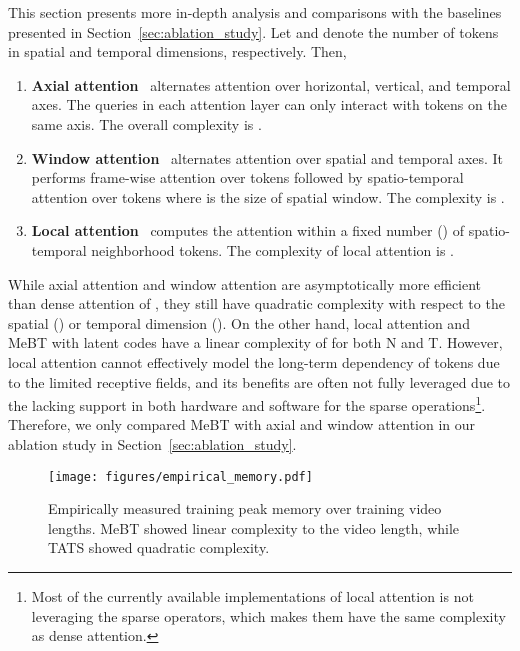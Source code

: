 \documentclass[10pt,twocolumn,letterpaper]{article}
\begin{document}
This section presents more in-depth analysis and comparisons with the baselines presented in Section~\ref{sec:ablation_study}.
Let  and  denote the number of tokens in spatial and temporal dimensions, respectively. Then,
\begin{enumerate}
    \item {\bf Axial attention}~\cite{Ho2019} alternates attention over horizontal, vertical, and temporal axes. 
    The queries in each attention layer can only interact with tokens on the same axis. 
    The overall complexity is .
    \item {\bf Window attention}~\cite{MaskViT} alternates attention over spatial and temporal axes. It performs frame-wise attention over  tokens followed by spatio-temporal attention over  tokens where  is the size of spatial window. The complexity is .
    \vspace{-0.4cm}
    \item {\bf Local attention}~\cite{NUWA} computes the attention within a fixed number () of spatio-temporal neighborhood tokens. The complexity of local attention is .
\end{enumerate}


While axial attention and window attention are asymptotically more efficient than dense attention of , they still have quadratic complexity with respect to the spatial () or temporal dimension (). On the other hand, local attention and MeBT with  latent codes have a linear complexity of  for both N and T. 
However, local attention cannot effectively model the long-term dependency of tokens due to the limited receptive fields, and its benefits are often not fully leveraged due to the lacking support in both hardware and software for the sparse operations\footnote{Most of the currently available implementations of local attention is not leveraging the sparse operators, which makes them have the same complexity as dense attention.}. Therefore, we only compared MeBT with axial and window attention in our ablation study in Section~\ref{sec:ablation_study}.










\begin{figure}[t]
    \centering
    \texttt{[image: figures/empirical\_memory.pdf]}
    \caption{Empirically measured training peak memory over training video lengths. MeBT showed linear complexity to the video length, while TATS showed quadratic complexity.}
    \label{fig:memory_comparison}
\end{figure}
\end{document}

